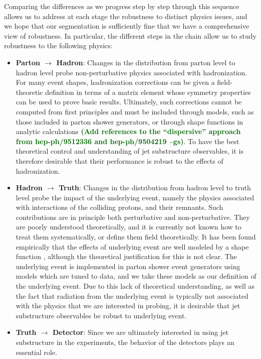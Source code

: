 \documentclass[11pt,letterpaper]{article}
\newcommand{\gs}[1]{\textbf{\textcolor{darkgreen}{(#1 --gs)}}}
\begin{document}
Comparing the differences as we progress step by step through this sequence allows us to address at each stage the robustness to distinct physics issues, and we hope that our segmentation is sufficiently fine that we have a comprehensive view of robustness.
%
In particular, the different steps in the chain allow us to study robustness to the following physics: 
%
\begin{itemize}
%
\item {\bf Parton $\to$ Hadron}: Changes in the distribution from parton
  level to hadron level probe non-perturbative physics associated with
  hadronization.
  For many event shapes, hadronization corrections can
  be given a field-theoretic definition in terms of a matrix element
  whose symmetry properties can be used to prove basic
  results.
  Ultimately, such corrections cannot be computed
  from first principles and must be included through models, such as
  those included in parton shower generators, or through shape
  functions in analytic calculations
  \cite{Korchemsky:1999kt,Korchemsky:2000kp,Bosch:2004th,Hoang:2007vb,Ligeti:2008ac}
  \gs{Add references to the ``dispersive'' approach from
    hep-ph/9512336 and hep-ph/9504219}.
    To have the best theoretical
  control and understanding of jet substructure observables, it is
  therefore desirable that their performance is robust to the effects
  of hadronization.
\item {\bf Hadron $\to$ Truth}: Changes in the distribution from hadron level to truth level probe the impact of the underlying event, namely the physics associated with interactions of the colliding protons, and their remnants.
%
Such contributions are in principle both perturbative and non-perturbative.
%
They are poorly understood theoretically, and it is currently not known how to treat them systematically, or define them field theoretically.
%
It has been found empirically that the effects of underlying event are well modeled by a shape function \cite{Stewart:2014nna}, although the theoretical justification for this is not clear.
%
The underlying event is implemented in parton shower event generators using models which are tuned to data, and we take these models as our definition of the underlying event.
%
Due to this lack of theoretical understanding, as well as the fact that radiation from the underlying event is typically not associated with the physics that we are interested in probing, it is desirable that jet substructure observables be robust to underlying event.
%
\item {\bf Truth $\to$ Detector}: Since we are ultimately interested in using jet substructure in the experiments, the behavior of the detectors plays an essential role.

\end{itemize}
\end{document}
